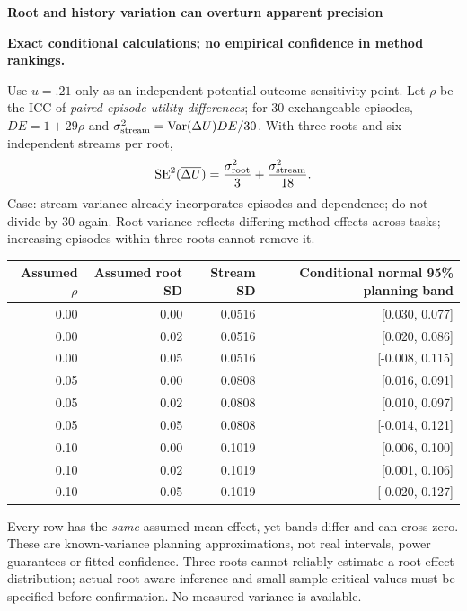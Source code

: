 \documentclass[10pt,a4paper]{article}
\newcommand{\lead}[1]{\vspace{3pt}\textbf{#1}\par}
\newcommand{\status}{\textcolor{red!70!black}{\textbf{Exact conditional calculations; no empirical confidence in method rankings.}}\par}
\begin{document}
\clearpage
\lead{Root and history variation can overturn apparent precision}\status
Use $u=.21$ only as an independent-potential-outcome sensitivity point.
Let $\rho$ be the ICC of \emph{paired episode utility differences}; for 30
exchangeable episodes, $DE=1+29\rho$ and
$\sigma_{\rm stream}^2=\operatorname{Var}(\Delta U)DE/30$.
With three roots and six independent streams per root,
\[
 \operatorname{SE}^2(\overline{\Delta U})=
 \frac{\sigma_{\rm root}^2}{3}+\frac{\sigma_{\rm stream}^2}{18}.
\]
Case: stream variance already incorporates episodes and dependence; do not
divide by 30 again. Root variance reflects differing method effects across
tasks; increasing episodes within three roots cannot remove it.
\begin{center}\small
\begin{tabular*}{\linewidth}{@{\extracolsep{\fill}}rrrr@{}}\toprule
Assumed $\rho$ & Assumed root SD & Stream SD & Conditional normal 95\% planning band\\\midrule
0.00 & 0.00 & 0.0516 & [0.030, 0.077]\\
0.00 & 0.02 & 0.0516 & [0.020, 0.086]\\
0.00 & 0.05 & 0.0516 & [-0.008, 0.115]\\
0.05 & 0.00 & 0.0808 & [0.016, 0.091]\\
0.05 & 0.02 & 0.0808 & [0.010, 0.097]\\
0.05 & 0.05 & 0.0808 & [-0.014, 0.121]\\
0.10 & 0.00 & 0.1019 & [0.006, 0.100]\\
0.10 & 0.02 & 0.1019 & [0.001, 0.106]\\
0.10 & 0.05 & 0.1019 & [-0.020, 0.127]\\
\bottomrule\end{tabular*}\end{center}
Every row has the \emph{same} assumed mean effect, yet bands differ and can cross
zero. These are known-variance planning approximations, not real intervals,
power guarantees or fitted confidence. Three roots cannot reliably estimate a
root-effect distribution; actual root-aware inference and small-sample critical
values must be specified before confirmation. No measured variance is available.
\end{document}
